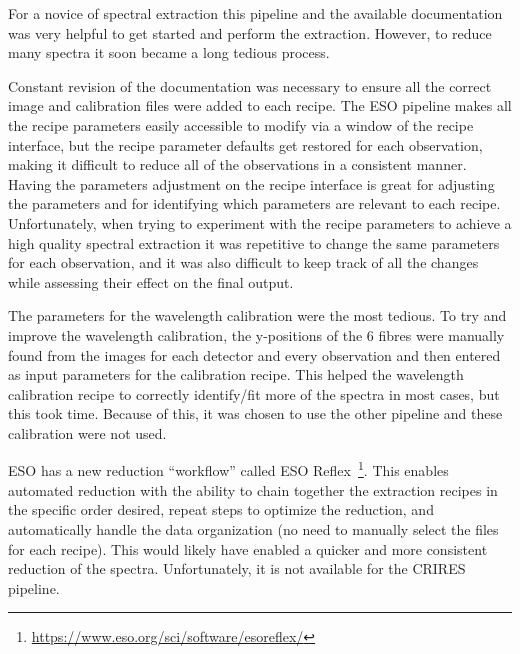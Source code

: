 For a novice of spectral extraction this pipeline and the available documentation was very helpful to get started and perform the extraction.
However, to reduce many spectra it soon became a long tedious process.

Constant revision of the documentation was necessary to ensure all the correct image and calibration files were added to each recipe.
The {ESO} pipeline makes all the recipe parameters easily accessible to modify via a window of the recipe interface, but the recipe parameter defaults get restored for each observation, making it difficult to reduce all of the observations in a consistent manner.
Having the parameters adjustment on the recipe interface is great for adjusting the parameters and for identifying which parameters are relevant to each recipe.
Unfortunately, when trying to experiment with the recipe parameters to achieve a high quality spectral extraction it was repetitive to change the same parameters for each observation, and it was also difficult to keep track of all the changes while assessing their effect on the final output.

The parameters for the wavelength calibration were the most tedious.
To try and improve the wavelength calibration, the {y-positions} of the 6 \thar{} fibres were manually found from the images for each detector and every observation and then entered as input parameters for the calibration recipe.
This helped the wavelength calibration recipe to correctly identify/fit more of the \thar{} spectra in most cases, but this took time.
Because of this, it was chosen to use the other pipeline and these calibration were not used.

{ESO} has a new reduction ``workflow'' called {ESO} Reflex~\citep{freudling_automated_2013}\footnote{\href{https://www.eso.org/sci/software/esoreflex/}{https://www.eso.org/sci/software/esoreflex/}}.
This enables automated reduction with the ability to chain together the extraction recipes in the specific order desired, repeat steps to optimize the reduction, and automatically handle the data organization (no need to manually select the files for each recipe).
This would likely have enabled a quicker and more consistent reduction of the spectra.
Unfortunately, it is not available for the {CRIRES} pipeline.

